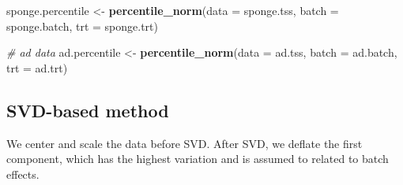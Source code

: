 \documentclass[]{book}
\newenvironment{Shaded}{\begin{snugshade}}{\end{snugshade}}
\newcommand{\KeywordTok}[1]{\textcolor[rgb]{0.13,0.29,0.53}{\textbf{#1}}}
\newcommand{\DataTypeTok}[1]{\textcolor[rgb]{0.13,0.29,0.53}{#1}}
\newcommand{\StringTok}[1]{\textcolor[rgb]{0.31,0.60,0.02}{#1}}
\newcommand{\CommentTok}[1]{\textcolor[rgb]{0.56,0.35,0.01}{\textit{#1}}}
\newcommand{\NormalTok}[1]{#1}
\begin{document}
\begin{Shaded}
\begin{Highlighting}[]
\NormalTok{sponge.percentile <-}\StringTok{ }\KeywordTok{percentile_norm}\NormalTok{(}\DataTypeTok{data =}\NormalTok{ sponge.tss, }\DataTypeTok{batch =}\NormalTok{ sponge.batch, }
                                    \DataTypeTok{trt =}\NormalTok{ sponge.trt)}

\CommentTok{# ad data}
\NormalTok{ad.percentile <-}\StringTok{ }\KeywordTok{percentile_norm}\NormalTok{(}\DataTypeTok{data =}\NormalTok{ ad.tss, }\DataTypeTok{batch =}\NormalTok{ ad.batch, }
                                \DataTypeTok{trt =}\NormalTok{ ad.trt)}
\end{Highlighting}
\end{Shaded}

\subsection{SVD-based method}\label{svd-based-method}

We center and scale the data before SVD. After SVD, we deflate the first
component, which has the highest variation and is assumed to related to
batch effects.
\end{document}
